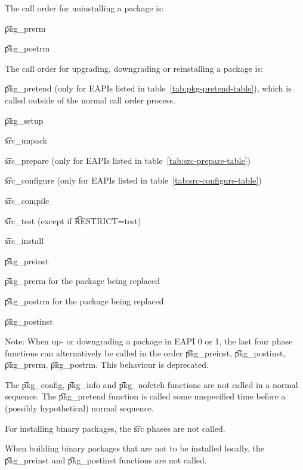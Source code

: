 The call order for uninstalling a package is:

\begin{compactitem}
\item \t{pkg\_prerm}
\item \t{pkg\_postrm}
\end{compactitem}

The call order for upgrading, downgrading or reinstalling a package is:

\begin{compactitem}
\item \t{pkg\_pretend} (only for EAPIs listed in table~\ref{tab:pkg-pretend-table}), which is called
    outside of the normal call order process.
\item \t{pkg\_setup}
\item \t{src\_unpack}
\item \t{src\_prepare} (only for EAPIs listed in table~\ref{tab:src-prepare-table})
\item \t{src\_configure} (only for EAPIs listed in table~\ref{tab:src-configure-table})
\item \t{src\_compile}
\item \t{src\_test} (except if \t{RESTRICT=test})
\item \t{src\_install}
\item \t{pkg\_preinst}
\item \t{pkg\_prerm} for the package being replaced
\item \t{pkg\_postrm} for the package being replaced
\item \t{pkg\_postinst}
\end{compactitem}

Note: When up- or downgrading a package in EAPI 0 or 1, the last four phase functions can
alternatively be called in the order \t{pkg\_preinst}, \t{pkg\_postinst}, \t{pkg\_prerm},
\t{pkg\_postrm}. This behaviour is deprecated.

The \t{pkg\_config}, \t{pkg\_info} and \t{pkg\_nofetch} functions are not called in a normal
sequence. The \t{pkg\_pretend} function is called some unspecified time before a (possibly
hypothetical) normal sequence.

For installing binary packages, the \t{src} phases are not called.

When building binary packages that are not to be installed locally, the \t{pkg\_preinst}
and \t{pkg\_postinst} functions are not called.


